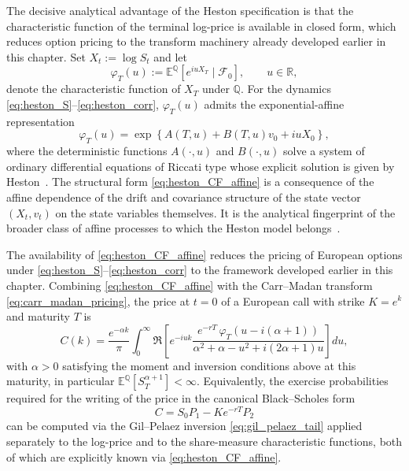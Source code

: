 The decisive analytical advantage of the Heston specification is that
the characteristic function of the terminal log-price is available in
closed form, which reduces option pricing to the transform machinery
already developed earlier in this chapter. Set $X_t:=\log S_t$ and let
\begin{equation}
\varphi_T(u)
:=
\mathbb{E}^{\mathbb{Q}}
\left[
e^{iuX_T}\mid\mathcal{F}_0
\right],
\qquad u\in\mathbb{R},
\end{equation}
denote the characteristic function of $X_T$ under $\mathbb{Q}$. For the
dynamics \eqref{eq:heston_S}--\eqref{eq:heston_corr}, $\varphi_T(u)$
admits the exponential-affine representation
\begin{equation}\label{eq:heston_CF_affine}
\varphi_T(u)
=
\exp\left\{
A(T,u)+B(T,u)v_0+iuX_0
\right\},
\end{equation}
where the deterministic functions $A(\cdot,u)$ and $B(\cdot,u)$ solve a
system of ordinary differential equations of Riccati type whose explicit
solution is given by Heston~\cite{Heston1993}. The structural form
\eqref{eq:heston_CF_affine} is a consequence of the affine dependence of
the drift and covariance structure of the state vector $(X_t,v_t)$ on
the state variables themselves. It is the analytical fingerprint of the
broader class of affine processes to which the Heston model
belongs~\cite{DuffiePanSingleton2000}.

The availability of \eqref{eq:heston_CF_affine} reduces the pricing of
European options under \eqref{eq:heston_S}--\eqref{eq:heston_corr} to the
framework developed earlier in this chapter. Combining
\eqref{eq:heston_CF_affine} with the Carr--Madan transform
\eqref{eq:carr_madan_pricing}, the price at $t=0$ of a European call
with strike $K=e^{k}$ and maturity $T$ is
\begin{equation}\label{eq:heston_call_price}
C(k)
=
\frac{e^{-\alpha k}}{\pi}
\int_0^{\infty}
\Re\!\left[
e^{-iuk}
\frac{
e^{-rT}\,
\varphi_T\!\left(u-i(\alpha+1)\right)
}{
\alpha^{2}+\alpha-u^{2}+i(2\alpha+1)u
}
\right]du,
\end{equation}
with $\alpha>0$ satisfying the moment and inversion conditions above
at this maturity, in particular $\mathbb E^{\mathbb Q}[S_T^{\alpha+1}]<\infty$.
Equivalently, the exercise
probabilities required for the writing of the price in the canonical
Black--Scholes form
\[
C=S_0P_1-Ke^{-rT}P_2
\]
can be computed via the Gil--Pelaez inversion
\eqref{eq:gil_pelaez_tail} applied separately to the log-price and to
the share-measure characteristic functions, both of which are explicitly
known via \eqref{eq:heston_CF_affine}.

